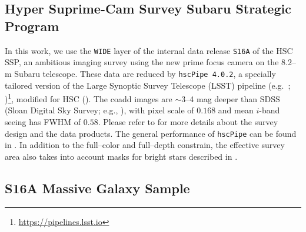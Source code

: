 \documentclass[a4paper,fleqn,usenatbib]{mnras}
\begin{document}
\subsection{Hyper Suprime-Cam Survey Subaru Strategic Program}
    \label{sec:hsc}      


	
	In this work, we use the \texttt{WIDE} layer of the internal data release 
	\texttt{S16A} of the HSC SSP, an ambitious imaging survey using the new prime focus 
	camera on the 8.2--m Subaru telescope. 
	These data are reduced by \texttt{hscPipe 4.0.2}, a specially tailored version of 
	the Large Synoptic Survey Telescope (LSST) pipeline (e.g.\ \citealt{Juric2015}; 
	\citealt{Axelrod2010})\footnote{\url{https://pipelines.lsst.io}}, 
	modified for HSC (\citealt{HSC-PIPE}).
	The coadd images are $\sim$3--4 mag deeper than SDSS (Sloan Digital Sky Survey; 
	e.g., \citealt{SDSS-DR7, SDSS-DR8, SDSS-DR12}), with pixel scale of 0\asec{}$.168$
	and mean $i$-band seeing has FWHM of 0\asec{}$.58$.
	Please refer to \citet{HSC-SSP, HSC-DR1} for more details about the survey design
	and the data products.
	The general performance of \texttt{hscPipe} can be found in \citet{SynPipe}.
	In addition to the full--color and full--depth constrain, the effective survey 
	area also takes into account masks for bright stars described in
	\citet{HSC-STAR}.


\subsection{S16A Massive Galaxy Sample}
    \label{sec:hsc}	
\end{document}
